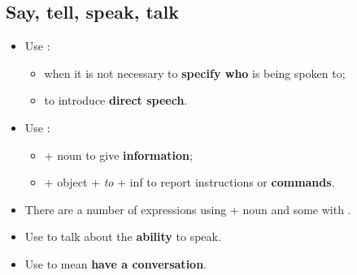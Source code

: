 \subsection{Say, tell, speak, talk}
\begin{itemize}
    \item Use :
    \begin{itemize}
        \item when it is not necessary to \textbf{specify who} is being spoken to;
        \item to introduce \textbf{direct speech}.
    \end{itemize}
    \item Use :
    \begin{itemize}
        \item + noun to give \textbf{information};
        \item + object + \textit{to} + inf to report instructions or \textbf{commands}.
    \end{itemize}
    \item There are a number of expressions using  + noun and some with .
    \item Use  to talk about the \textbf{ability} to speak.
    \item Use  to mean \textbf{have a conversation}.
\end{itemize}

